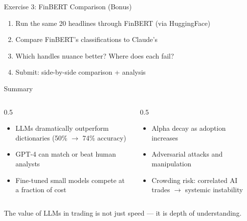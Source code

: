 \documentclass[aspectratio=169]{beamer}
\begin{document}
\begin{frame}{Exercise 3: FinBERT Comparison (Bonus)}
\begin{enumerate}
  \item Run the same 20 headlines through FinBERT (via HuggingFace)
  \item Compare FinBERT's classifications to Claude's
  \item Which handles nuance better? Where does each fail?
  \item Submit: side-by-side comparison + analysis
\end{enumerate}
\end{frame}

\begin{frame}{Summary}
\begin{columns}[T]
\begin{column}{0.5\textwidth}
\begin{shadedbox}[title=\textbf{What We Know}]
\begin{itemize}\small
  \item LLMs dramatically outperform dictionaries (50\% $\rightarrow$ 74\% accuracy)
  \item GPT-4 can match or beat human analysts
  \item Fine-tuned small models compete at a fraction of cost
\end{itemize}
\end{shadedbox}
\end{column}
\begin{column}{0.5\textwidth}
\begin{shadedbox}[title=\textbf{What to Watch}]
\begin{itemize}\small
  \item Alpha decay as adoption increases
  \item Adversarial attacks and manipulation
  \item Crowding risk: correlated AI trades $\rightarrow$ systemic instability
\end{itemize}
\end{shadedbox}
\end{column}
\end{columns}
\vspace{0.3cm}
\begin{center}
\alert{The value of LLMs in trading is not just speed --- it is depth of understanding.}
\end{center}
\end{frame}

\end{document}
